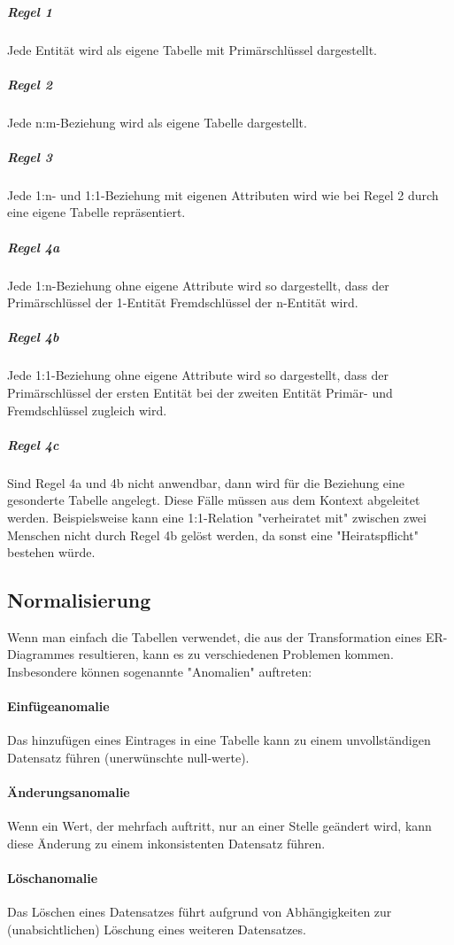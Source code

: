 \documentclass{article}
\begin{document}
	\subparagraph{Regel 1}
	Jede Entität wird als eigene Tabelle mit Primärschlüssel dargestellt.

	\subparagraph{Regel 2}
	Jede n:m-Beziehung wird als eigene Tabelle dargestellt.

	\subparagraph{Regel 3}
	Jede 1:n- und 1:1-Beziehung mit eigenen Attributen wird wie bei Regel 2 durch eine eigene Tabelle repräsentiert.

	\subparagraph{Regel 4a}
	Jede 1:n-Beziehung ohne eigene Attribute wird so dargestellt, dass der Primärschlüssel der 1-Entität Fremdschlüssel der n-Entität wird.

	\subparagraph{Regel 4b}
	Jede 1:1-Beziehung ohne eigene Attribute wird so dargestellt, dass der Primärschlüssel der ersten Entität bei der zweiten Entität Primär- und Fremdschlüssel zugleich wird.

	\subparagraph{Regel 4c}
	Sind Regel 4a und 4b nicht anwendbar, dann wird für die Beziehung eine gesonderte Tabelle angelegt. Diese Fälle müssen aus dem Kontext abgeleitet werden.
	Beispielsweise kann eine 1:1-Relation "verheiratet mit" zwischen zwei Menschen nicht durch Regel 4b gelöst werden, da sonst eine "Heiratspflicht" bestehen würde.

	\subsection{Normalisierung}
	Wenn man einfach die Tabellen verwendet, die aus der Transformation eines ER-Diagrammes resultieren, kann es zu verschiedenen Problemen kommen. Insbesondere können sogenannte "Anomalien" auftreten:

	\paragraph{Einfügeanomalie}
	Das hinzufügen eines Eintrages in eine Tabelle kann zu einem unvollständigen Datensatz führen (unerwünschte null-werte).

	\paragraph{Änderungsanomalie}
	Wenn ein Wert, der mehrfach auftritt, nur an einer Stelle geändert wird, kann diese Änderung zu einem inkonsistenten Datensatz führen.

	\paragraph{Löschanomalie}
	Das Löschen eines Datensatzes führt aufgrund von Abhängigkeiten zur (unabsichtlichen) Löschung eines weiteren Datensatzes.
\end{document}
